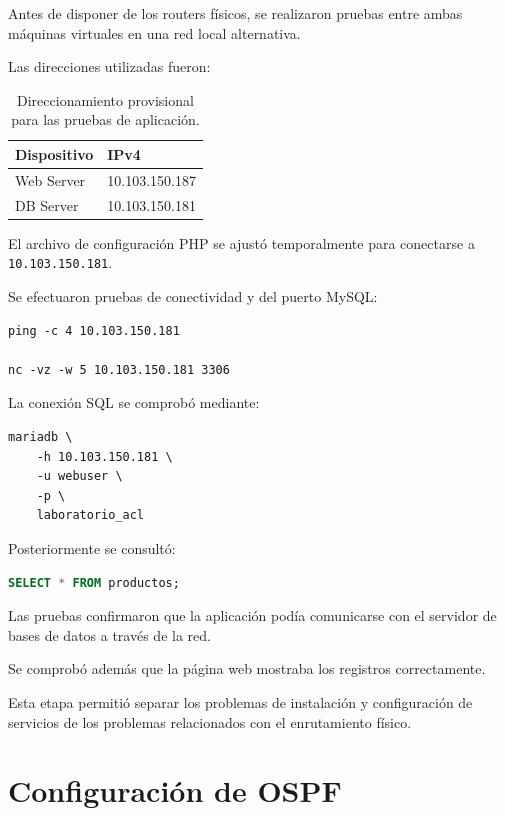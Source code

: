 \documentclass[12pt,a4paper]{article}
\begin{document}
Antes de disponer de los routers
físicos, se realizaron pruebas
entre ambas máquinas virtuales
en una red local alternativa.

Las direcciones utilizadas fueron:

\begin{table}[H]
\centering
\begin{tabular}{|l|l|}
\hline
\textbf{Dispositivo} & \textbf{IPv4} \\
\hline
Web Server & 10.103.150.187 \\
\hline
DB Server & 10.103.150.181 \\
\hline
\end{tabular}
\caption{Direccionamiento provisional
para las pruebas de aplicación.}
\end{table}

El archivo de configuración PHP
se ajustó temporalmente para
conectarse a \texttt{10.103.150.181}.

Se efectuaron pruebas de conectividad
y del puerto MySQL:

\begin{lstlisting}
ping -c 4 10.103.150.181

nc -vz -w 5 10.103.150.181 3306
\end{lstlisting}

La conexión SQL se comprobó mediante:

\begin{lstlisting}
mariadb \
    -h 10.103.150.181 \
    -u webuser \
    -p \
    laboratorio_acl
\end{lstlisting}

Posteriormente se consultó:

\begin{lstlisting}[language=SQL]
SELECT * FROM productos;
\end{lstlisting}

Las pruebas confirmaron que
la aplicación podía comunicarse
con el servidor de bases
de datos a través de la red.

Se comprobó además que la
página web mostraba los registros
correctamente.

Esta etapa permitió separar los
problemas de instalación y
configuración de servicios
de los problemas relacionados
con el enrutamiento físico.

\section{Configuración de OSPF}
\end{document}
